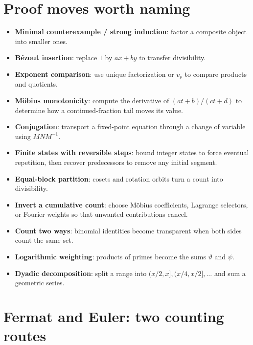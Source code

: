 \section*{Proof moves worth naming}

\begin{itemize}
  \item \textbf{Minimal counterexample / strong induction}: factor a composite object into smaller ones.
  \item \textbf{B\'ezout insertion}: replace $1$ by $ax+by$ to transfer divisibility.
  \item \textbf{Exponent comparison}: use unique factorization or $v_p$ to compare products and quotients.
  \item \textbf{M\"obius monotonicity}: compute the derivative of $(at+b)/(ct+d)$ to determine how a continued-fraction tail moves its value.
  \item \textbf{Conjugation}: transport a fixed-point equation through a change of variable using $MNM^{-1}$.
  \item \textbf{Finite states with reversible steps}: bound integer states to force eventual repetition, then recover predecessors to remove any initial segment.
  \item \textbf{Equal-block partition}: cosets and rotation orbits turn a count into divisibility.
  \item \textbf{Invert a cumulative count}: choose M\"obius coefficients, Lagrange selectors, or Fourier weights so that unwanted contributions cancel.
  \item \textbf{Count two ways}: binomial identities become transparent when both sides count the same set.
  \item \textbf{Logarithmic weighting}: products of primes become the sums $\vartheta$ and $\psi$.
  \item \textbf{Dyadic decomposition}: split a range into $(x/2,x],(x/4,x/2],\dots$ and sum a geometric series.
\end{itemize}

\section*{Fermat and Euler: two counting routes}


